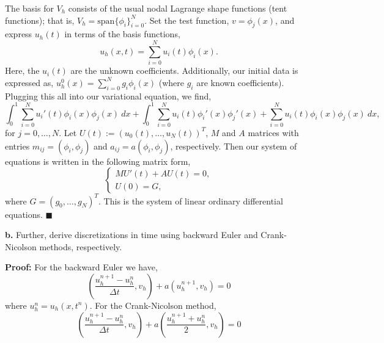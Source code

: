 \documentclass[11pt]{article}
\begin{document}
The basis for $V_h$ consists of the usual nodal Lagrange shape functions (tent functions); that is, $V_h = \text{span}\{\phi_i\}_{i=0}^N$.
Set the test function, $v = \phi_j(x)$, and express $u_h(t)$ in terms of the basis functions,
\begin{equation*}
    u_h(x,t) = \sum_{i=0}^N u_i(t) \phi_i(x).
\end{equation*}
Here, the $u_i(t)$ are the unknown coefficients.
Additionally, our initial data is expressed as, $u^0_h(x) = \sum_{i=0}^N g_i \phi_i(x)$ (where $g_i$ are known coefficients).
Plugging this all into our variational equation, we find,
\begin{equation*}
    \int_0^1 \sum_{i=0}^N u_i'(t) \phi_i(x) \phi_j(x) \: dx + \int_0^1 \sum_{i=0}^N u_i(t) \phi_i'(x) \phi_j'(x) + \sum_{i=0}^N u_i(t) \phi_i(x) \phi_j(x) \: dx,
\end{equation*}
for $j = 0, \ldots, N$.
Let $U(t) := (u_0(t), \ldots, u_N(t))^T$, $M$ and $A$ matrices with entries $m_{ij} = (\phi_i, \phi_j)$ and $a_{ij} = a(\phi_i, \phi_j)$, respectively.
Then our system of equations is written in the following matrix form,
\begin{equation*}
\begin{cases}
    MU'(t) + AU(t) = 0, \\
    U(0) = G,
\end{cases}
\end{equation*}
where $G = (g_0, \ldots, g_N)^T$.
This is the system of linear ordinary differential equations.
$\blacksquare$


\vskip 2cm



\textbf{b.} Further, derive discretizations in time using backward Euler and Crank-Nicolson methods, respectively.

\vskip 1cm


\textbf{Proof:} For the backward Euler we have,
\begin{equation}
	(\frac{u^{n+1}_h - u^n_h}{\Delta t}, v_h) + a(u^{n+1}_h, v_h) = 0
\end{equation}
where $u^n_h = u_h(x,t^n)$. 
For the Crank-Nicolson method,
\begin{equation}
	(\frac{u^{n+1}_h - u^n_h}{\Delta t}, v_h) + a(\frac{u^{n+1}_h + u^n_h}{2}, v_h) = 0
\end{equation}
\end{document}
